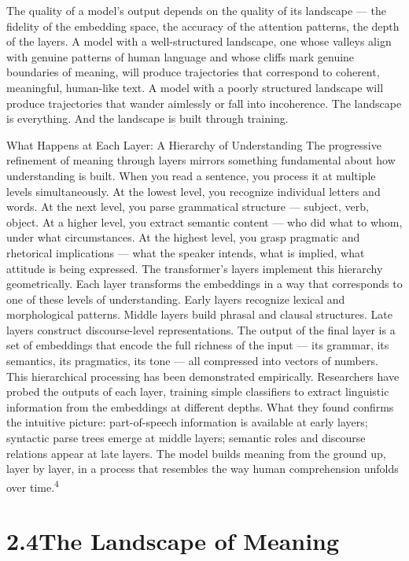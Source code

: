 The quality of a model’s output depends on the quality of its landscape — the fidelity of the embedding space, the accuracy of the attention patterns, the depth of the layers. A model with a well-structured landscape, one whose valleys align with genuine patterns of human language and whose cliffs mark genuine boundaries of meaning, will produce trajectories that correspond to coherent, meaningful, human-like text. A model with a poorly structured landscape will produce trajectories that wander aimlessly or fall into incoherence. The landscape is everything. And the landscape is built through training.

What Happens at Each Layer: A Hierarchy of Understanding The progressive refinement of meaning through layers mirrors something fundamental about how understanding is built. When you read a sentence, you process it at multiple levels simultaneously. At the lowest level, you recognize individual letters and words. At the next level, you parse grammatical structure — subject, verb, object. At a higher level, you extract semantic content — who did what to whom, under what circumstances. At the highest level, you grasp pragmatic and rhetorical implications — what the speaker intends, what is implied, what attitude is being expressed. The transformer’s layers implement this hierarchy geometrically. Each layer transforms the embeddings in a way that corresponds to one of these levels of understanding. Early layers recognize lexical and morphological patterns. Middle layers build phrasal and clausal structures. Late layers construct discourse-level representations. The output of the final layer is a set of embeddings that encode the full richness of the input — its grammar, its semantics, its pragmatics, its tone — all compressed into vectors of numbers. This hierarchical processing has been demonstrated empirically. Researchers have probed the outputs of each layer, training simple classifiers to extract linguistic information from the embeddings at different depths. What they found confirms the intuitive picture: part-of-speech information is available at early layers; syntactic parse trees emerge at middle layers; semantic roles and discourse relations appear at late layers. The model builds meaning from the ground up, layer by layer, in a process that resembles the way human comprehension unfolds over time.\textsuperscript{4}

\section{2.4\quad The Landscape of Meaning}

